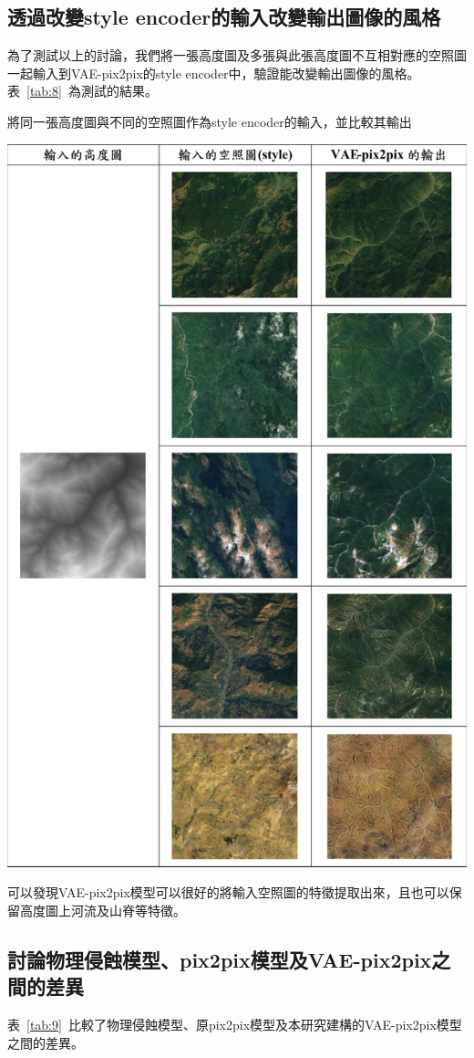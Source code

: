 \documentclass[a4paper, 12pt]{article}
\begin{document}
\subsection{透過改變style encoder的輸入改變輸出圖像的風格}
為了測試以上的討論，我們將一張高度圖及多張與此張高度圖不互相對應的空照圖一起輸入到VAE-pix2pix的style encoder中，驗證能改變輸出圖像的風格。表~\ref{tab:8}~為測試的結果。
\begin{table}[htbp]
    \centering
    \caption{將同一張高度圖與不同的空照圖作為style encoder的輸入，並比較其輸出}
    \label{tab:8}
    \includegraphics[width=0.8\linewidth]{fig/tab8.jpg}
\end{table}
可以發現VAE-pix2pix模型可以很好的將輸入空照圖的特徵提取出來，且也可以保留高度圖上河流及山脊等特徵。
\subsection{討論物理侵蝕模型、pix2pix模型及VAE-pix2pix之間的差異}
表~\ref{tab:9}~比較了物理侵蝕模型、原pix2pix模型及本研究建構的VAE-pix2pix模型之間的差異。
\end{document}
